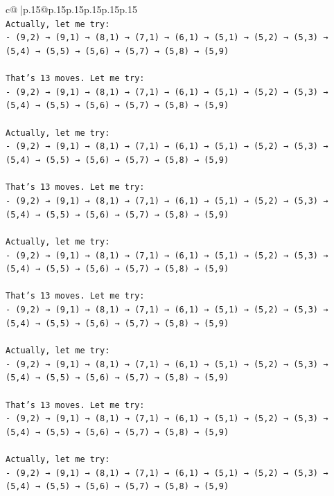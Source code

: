 \documentclass{article}
\begin{document}
{\begin{supertabular}{c@{$\;$}|p{.15\linewidth}@{}p{.15\linewidth}p{.15\linewidth}p{.15\linewidth}p{.15\linewidth}p{.15\linewidth}}
{{{\\ 
\texttt{Actually, let me try:} \\
\texttt{{-} (9,2) → (9,1) → (8,1) → (7,1) → (6,1) → (5,1) → (5,2) → (5,3) → (5,4) → (5,5) → (5,6) → (5,7) → (5,8) → (5,9)} \\
\\ 
\texttt{That's 13 moves. Let me try:} \\
\texttt{{-} (9,2) → (9,1) → (8,1) → (7,1) → (6,1) → (5,1) → (5,2) → (5,3) → (5,4) → (5,5) → (5,6) → (5,7) → (5,8) → (5,9)} \\
\\ 
\texttt{Actually, let me try:} \\
\texttt{{-} (9,2) → (9,1) → (8,1) → (7,1) → (6,1) → (5,1) → (5,2) → (5,3) → (5,4) → (5,5) → (5,6) → (5,7) → (5,8) → (5,9)} \\
\\ 
\texttt{That's 13 moves. Let me try:} \\
\texttt{{-} (9,2) → (9,1) → (8,1) → (7,1) → (6,1) → (5,1) → (5,2) → (5,3) → (5,4) → (5,5) → (5,6) → (5,7) → (5,8) → (5,9)} \\
\\ 
\texttt{Actually, let me try:} \\
\texttt{{-} (9,2) → (9,1) → (8,1) → (7,1) → (6,1) → (5,1) → (5,2) → (5,3) → (5,4) → (5,5) → (5,6) → (5,7) → (5,8) → (5,9)} \\
\\ 
\texttt{That's 13 moves. Let me try:} \\
\texttt{{-} (9,2) → (9,1) → (8,1) → (7,1) → (6,1) → (5,1) → (5,2) → (5,3) → (5,4) → (5,5) → (5,6) → (5,7) → (5,8) → (5,9)} \\
\\ 
\texttt{Actually, let me try:} \\
\texttt{{-} (9,2) → (9,1) → (8,1) → (7,1) → (6,1) → (5,1) → (5,2) → (5,3) → (5,4) → (5,5) → (5,6) → (5,7) → (5,8) → (5,9)} \\
\\ 
\texttt{That's 13 moves. Let me try:} \\
\texttt{{-} (9,2) → (9,1) → (8,1) → (7,1) → (6,1) → (5,1) → (5,2) → (5,3) → (5,4) → (5,5) → (5,6) → (5,7) → (5,8) → (5,9)} \\
\\ 
\texttt{Actually, let me try:} \\
\texttt{{-} (9,2) → (9,1) → (8,1) → (7,1) → (6,1) → (5,1) → (5,2) → (5,3) → (5,4) → (5,5) → (5,6) → (5,7) → (5,8) → (5,9)} \\
\\ 
}}}
\end{supertabular}}
\end{document}
